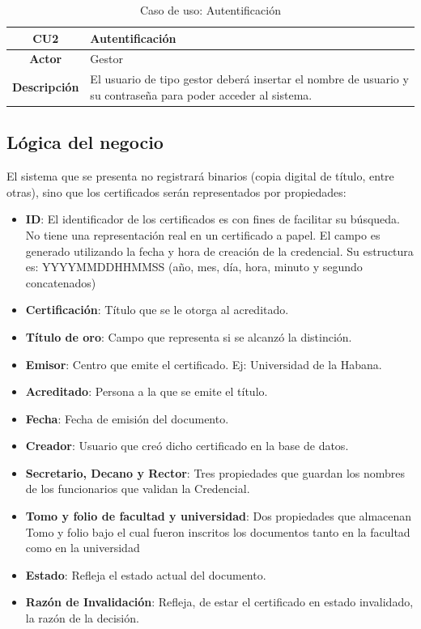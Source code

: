 \begin{table}[!h]
	\begin{center}
		\begin{tabular}{|c|p{10cm}|}
		\hline \textbf{CU2} & Autentificación \\ 
		\hline \textbf{Actor} & Gestor\\ 
		\hline \textbf{Descripción} & El usuario de tipo gestor deberá insertar el nombre de usuario y su contraseña para poder acceder al sistema.\\ 
		\hline 
		\end{tabular}
		\caption{Caso de uso: Autentificación}
		\label{tab:CU2}
	\end{center}
\end{table}

\subsection{Lógica del negocio}
El sistema que se presenta no registrará binarios (copia digital de título, entre otras), sino que los certificados serán representados por propiedades:
\begin{itemize}
\item \textbf{ID}: El identificador de los certificados es con fines de facilitar su búsqueda. No tiene una representación real en un certificado a papel. El campo es generado utilizando la fecha y hora de creación de la credencial. Su estructura es: YYYYMMDDHHMMSS (año, mes, día, hora, minuto y segundo concatenados)
\item \textbf{Certificación}: Título que se le otorga al acreditado.
\item \textbf{Título de oro}: Campo que representa si se alcanzó la distinción.
\item \textbf{Emisor}: Centro que emite el certificado. Ej: Universidad de la Habana.
\item \textbf{Acreditado}: Persona a la que se emite el título.
\item \textbf{Fecha}: Fecha de emisión del documento.
\item \textbf{Creador}: Usuario que creó dicho certificado en la base de datos.
\item \textbf{Secretario, Decano y Rector}: Tres propiedades que guardan los nombres de los funcionarios que validan la Credencial.
\item \textbf{Tomo y folio de facultad y universidad}: Dos propiedades que almacenan Tomo y folio bajo el cual fueron inscritos los documentos tanto en la facultad como en la universidad
\item \textbf{Estado}: Refleja el estado actual del documento.
\item \textbf{Razón de Invalidación}: Refleja, de estar el certificado en estado invalidado, la razón de la decisión.
\end{itemize}

